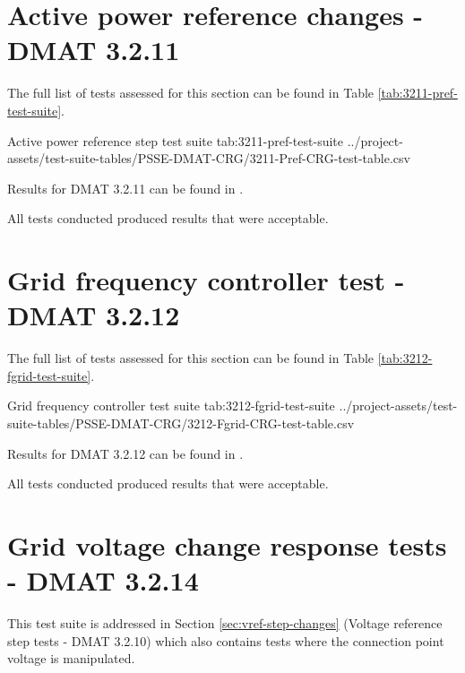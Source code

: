 \documentclass{../grid-link-report}
\newcommand{\projectassetsdir}{../project-assets}
\begin{document}
	
	
	\section{Active power reference changes - DMAT 3.2.11}	
	\label{sec:pref-step-tests}
	
	
	
	
	
	The full list of tests assessed for this section can be found in Table \ref{tab:3211-pref-test-suite}.
	
	{
		\fontsize{6}{8}\selectfont
		\autoscaledlongtable
		{Active power reference step test suite}
		{tab:3211-pref-test-suite}
		{\projectassetsdir/test-suite-tables/PSSE-DMAT-CRG/3211-Pref-CRG-test-table.csv}
	}
	
	Results for DMAT 3.2.11 can be found in .
	
	All tests conducted produced results that were acceptable.
	
	
	\section{Grid frequency controller test - DMAT 3.2.12}		
	
	
	
	
	The full list of tests assessed for this section can be found in Table \ref{tab:3212-fgrid-test-suite}.
	
	{
		\fontsize{7}{9}\selectfont
		\autoscaledlongtable
		{Grid frequency controller test suite}
		{tab:3212-fgrid-test-suite}
		{\projectassetsdir/test-suite-tables/PSSE-DMAT-CRG/3212-Fgrid-CRG-test-table.csv}
	}
	
	Results for DMAT 3.2.12 can be found in .	
	
	All tests conducted produced results that were acceptable.
	
	
	\section{Grid voltage change response tests - DMAT 3.2.14}		
	
	
	This test suite is addressed in Section \ref{sec:vref-step-changes} (Voltage reference step tests - DMAT 3.2.10) which also contains tests where the connection point voltage is manipulated.
	
\end{document}
